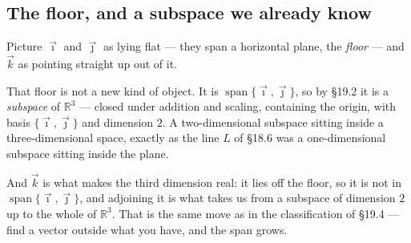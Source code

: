 \documentclass[11pt]{article}
\theoremstyle{definition}
\theoremstyle{remark}
\newcommand{\R}{\mathbb{R}}
\newcommand{\ivec}{\vec{\imath}}
\newcommand{\jvec}{\vec{\jmath}}
\newcommand{\kvec}{\vec{k}}
\DeclareMathOperator{\spanop}{span}   %
\begin{document}
\subsection{The floor, and a subspace we already know}
Picture $\ivec$ and $\jvec$ as lying flat --- they span a horizontal plane, the
\emph{floor} --- and $\kvec$ as pointing straight up out of it.

\begin{center}
\end{center}

\noindent That floor is not a new kind of object. It is
$\spanop\{\ivec,\jvec\}$, so by \S19.2 it is a \emph{subspace} of $\R^{3}$ ---
closed under addition and scaling, containing the origin, with basis
$\{\ivec,\jvec\}$ and dimension $2$. A two-dimensional subspace sitting inside a
three-dimensional space, exactly as the line $L$ of \S18.6 was a
one-dimensional subspace sitting inside the plane.

And $\kvec$ is what makes the third dimension real: it lies off the floor, so it
is not in $\spanop\{\ivec,\jvec\}$, and adjoining it is what takes us from a
subspace of dimension $2$ up to the whole of $\R^{3}$. That is the same move as
in the classification of \S19.4 --- find a vector outside what you have, and the
span grows.

\end{document}
